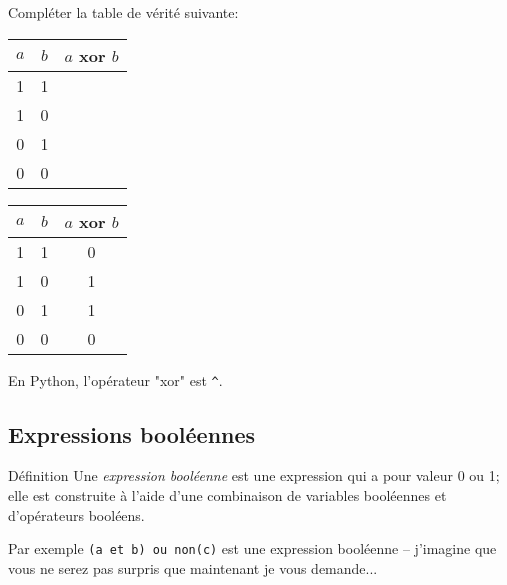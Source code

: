 \documentclass[12pt]{article}
\begin{document}
	\begin{MonExo}
		Compléter la table de vérité suivante:
		\\
		
		\begin{center}		
			\begin{tabular}{|c|c|c|}
				\hline
				$a$ & $b$ & $a$ xor $b$ \\ \hline
				1 & 1 &  \\ \hline
				1 & 0 &  \\ \hline
				0 & 1 &  \\ \hline
				0 & 0 &  \\ \hline
			\end{tabular}
		\end{center}
	\end{MonExo}
	\begin{MaReponse}
		\begin{center}		
			\begin{tabular}{|c|c|c|}
				\hline
				$a$ & $b$ & $a$ xor $b$ \\ \hline
				1 & 1 & 0 \\ \hline
				1 & 0 & 1 \\ \hline
				0 & 1 & 1 \\ \hline
				0 & 0 & 0 \\ \hline
			\end{tabular}
		\end{center}
	\end{MaReponse}
	
	En Python, l'opérateur "xor" est \texttt{\^}.
	
	\subsection{Expressions booléennes}
	
	\begin{MonAmp}{Définition}
		Une \textit{expression booléenne} est une expression qui a pour valeur 0 ou 1; elle est construite à l'aide d'une combinaison de variables booléennes et d'opérateurs booléens.
	\end{MonAmp}
	
	Par exemple \texttt{(a et b) ou non(c)} est une expression booléenne -- j'imagine que vous ne serez pas surpris que maintenant je vous demande...
	
\end{document}
